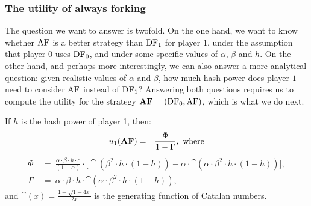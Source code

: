 \subsubsection{The utility of always forking}
The question we want to answer is twofold. On the one hand, we want to know whether $\text{\rm AF}$ is a better strategy than $\text{\rm DF}_1$ for player $1$, under the assumption that player $0$ uses $\text{\rm DF}_0$, and under some specific values of $\alpha$, $\beta$ and $h$. 
On the other hand, and 
perhaps more interestingly, we can also answer a more analytical question: given realistic values of $\alpha$ and $\beta$, how much hash power does player $1$ need to consider $\text{\rm AF}$ instead of $\text{\rm DF}_1$? 
Answering both questions requires us to compute the utility for the strategy $\text{\rm {\bf AF}}=(\text{\rm DF}_0,\text{\rm AF})$, which is what we do next. 

\begin{theorem}\label{thm:always_fork}
If $h$ is the hash power of player 1, then:
\begin{eqnarray*}
u_1(\text{\rm {\bf AF}}) &=& \frac{\Phi}{1-\Gamma}, \mbox{ where}
\end{eqnarray*}
\begin{align*}
\Phi & \ = \ \frac{\alpha \cdot \beta \cdot h \cdot c}{(1-\alpha)} \cdot \big[\cat(\beta^2 \cdot h \cdot (1-h)) - \alpha\cdot \cat(\alpha \cdot \beta^2 \cdot h \cdot (1-h))\big],\\
\Gamma & \ = \ \alpha \cdot \beta \cdot h \cdot \cat(\alpha\cdot \beta^2 \cdot h \cdot (1-h)),
\end{align*}
and $\cat(x) = \frac{1-\sqrt{1-4x}}{2x}$ is the generating function of Catalan numbers.
\end{theorem}



